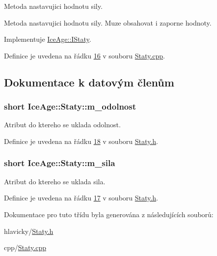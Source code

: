 Metoda nastavujici hodnotu sily. 

Metoda nastavujici hodnotu sily. Muze obsahovat i zaporne hodnoty. 

Implementuje \hyperlink{classIceAge_1_1IStaty_aa1c9b32a5fe0164dc4a04fc19b087742}{Ice\+Age\+::\+I\+Staty}.



Definice je uvedena na řádku \hyperlink{Staty_8cpp_source_l00016}{16} v souboru \hyperlink{Staty_8cpp_source}{Staty.\+cpp}.



\subsection{Dokumentace k datovým členům}
\subsubsection[{\texorpdfstring{m\+\_\+odolnost}{m_odolnost}}]{\setlength{\rightskip}{0pt plus 5cm}short Ice\+Age\+::\+Staty\+::m\+\_\+odolnost\hspace{0.3cm}{\ttfamily [protected]}}\hypertarget{classIceAge_1_1Staty_a71017d01cdc77192c6f70946b25a74e8}{}\label{classIceAge_1_1Staty_a71017d01cdc77192c6f70946b25a74e8}


Atribut do ktereho se uklada odolnost. 



Definice je uvedena na řádku \hyperlink{Staty_8h_source_l00018}{18} v souboru \hyperlink{Staty_8h_source}{Staty.\+h}.

\subsubsection[{\texorpdfstring{m\+\_\+sila}{m_sila}}]{\setlength{\rightskip}{0pt plus 5cm}short Ice\+Age\+::\+Staty\+::m\+\_\+sila\hspace{0.3cm}{\ttfamily [protected]}}\hypertarget{classIceAge_1_1Staty_a9ff580be9af5b83c9a26cbb031a39cce}{}\label{classIceAge_1_1Staty_a9ff580be9af5b83c9a26cbb031a39cce}


Atribut do ktereho se uklada sila. 



Definice je uvedena na řádku \hyperlink{Staty_8h_source_l00017}{17} v souboru \hyperlink{Staty_8h_source}{Staty.\+h}.



Dokumentace pro tuto třídu byla generována z následujících souborů\+:\begin{DoxyCompactItemize}
\item 
hlavicky/\hyperlink{Staty_8h}{Staty.\+h}\item 
cpp/\hyperlink{Staty_8cpp}{Staty.\+cpp}\end{DoxyCompactItemize}

